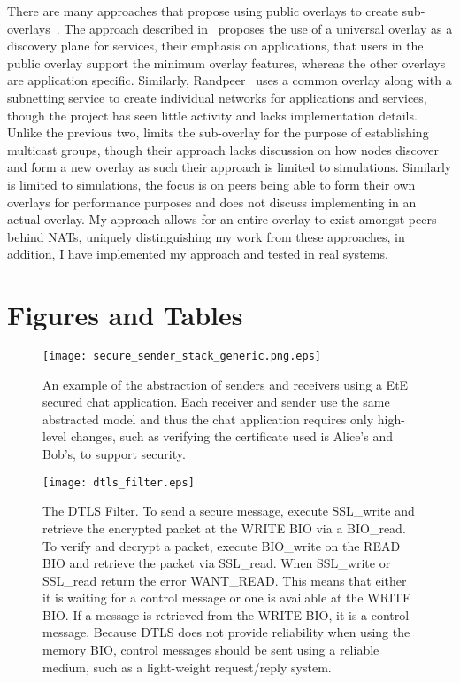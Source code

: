 There are many approaches that propose using public overlays to create
sub-overlays~\cite{one_ring, randpeer, can_multicast, community_overlays}.
The approach described in~\cite{one_ring} proposes the use of a universal
overlay as a discovery plane for services, their emphasis on applications,
that users in the public overlay support the minimum overlay features,
whereas the other overlays are application specific.  Similarly,
Randpeer~\cite{randpeer} uses a common overlay along with a subnetting service
to create individual networks for applications and services, though the project
has seen little activity and lacks implementation details.  Unlike the previous
two, \cite{can_multicast} limits the sub-overlay for the purpose of establishing
multicast groups, though their approach lacks discussion on how nodes discover
and form a new overlay as such their approach is limited to simulations.
Similarly \cite{community_overlays} is limited to simulations, the focus is
on peers being able to form their own overlays for performance purposes and
does not discuss implementing in an actual overlay.  My approach allows for an
entire overlay to exist amongst peers behind NATs, uniquely distinguishing my
work from these approaches, in addition, I have implemented my approach and
tested in real systems.

\section{Figures and Tables}

\begin{figure}[ht]
\centering
\texttt{[image: secure\_sender\_stack\_generic.png.eps]}
\caption[Secure sender stack]{An example of the abstraction of senders and
receivers using a EtE secured chat application.  Each receiver and sender use
the same abstracted model and thus the chat application requires only high-level
changes, such as verifying the certificate used is Alice's and Bob's, to support
security.}
\label{fig:senders_receivers}
\end{figure}

\begin{figure}[ht]
\centering
\texttt{[image: dtls\_filter.eps]}
\caption[The DTLS filter.]{The DTLS Filter.  To send a secure message, execute
SSL\_write and retrieve the encrypted packet at the WRITE BIO via a BIO\_read.
To verify and decrypt a packet, execute BIO\_write on the READ BIO and retrieve
the packet via SSL\_read.  When SSL\_write or SSL\_read return the error
WANT\_READ.  This means that either it is waiting for a control message or one
is available at the WRITE BIO.  If a message is retrieved from the WRITE BIO,
it is a control message.  Because DTLS does not provide reliability when using
the memory BIO, control messages should be sent using a reliable medium, such
as a light-weight request/reply system.}
\label{fig:dtls_filter}
\end{figure}

